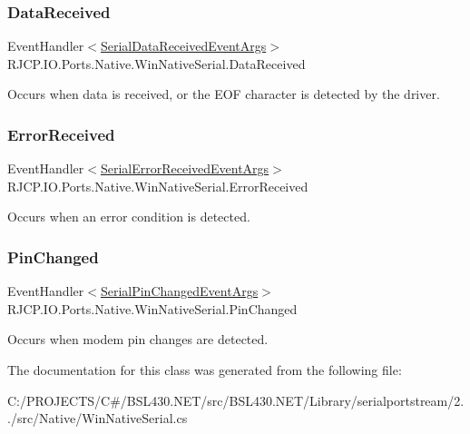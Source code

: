 \subsubsection{\texorpdfstring{DataReceived}{DataReceived}}
{\footnotesize\ttfamily Event\+Handler$<$\mbox{\hyperlink{class_r_j_c_p_1_1_i_o_1_1_ports_1_1_serial_data_received_event_args}{Serial\+Data\+Received\+Event\+Args}}$>$ R\+J\+C\+P.\+I\+O.\+Ports.\+Native.\+Win\+Native\+Serial.\+Data\+Received}



Occurs when data is received, or the E\+OF character is detected by the driver. 

\mbox{\label{class_r_j_c_p_1_1_i_o_1_1_ports_1_1_native_1_1_win_native_serial_a38516663cb2df0644f512fae0d4bd65d}} 
\subsubsection{\texorpdfstring{ErrorReceived}{ErrorReceived}}
{\footnotesize\ttfamily Event\+Handler$<$\mbox{\hyperlink{class_r_j_c_p_1_1_i_o_1_1_ports_1_1_serial_error_received_event_args}{Serial\+Error\+Received\+Event\+Args}}$>$ R\+J\+C\+P.\+I\+O.\+Ports.\+Native.\+Win\+Native\+Serial.\+Error\+Received}



Occurs when an error condition is detected. 

\mbox{\label{class_r_j_c_p_1_1_i_o_1_1_ports_1_1_native_1_1_win_native_serial_a792fefde319c63e680f024a48023617a}} 
\subsubsection{\texorpdfstring{PinChanged}{PinChanged}}
{\footnotesize\ttfamily Event\+Handler$<$\mbox{\hyperlink{class_r_j_c_p_1_1_i_o_1_1_ports_1_1_serial_pin_changed_event_args}{Serial\+Pin\+Changed\+Event\+Args}}$>$ R\+J\+C\+P.\+I\+O.\+Ports.\+Native.\+Win\+Native\+Serial.\+Pin\+Changed}



Occurs when modem pin changes are detected. 



The documentation for this class was generated from the following file\+:\begin{DoxyCompactItemize}
\item 
C\+:/\+P\+R\+O\+J\+E\+C\+T\+S/\+C\#/\+B\+S\+L430.\+N\+E\+T/src/\+B\+S\+L430.\+N\+E\+T/\+Library/serialportstream/2../src/\+Native/Win\+Native\+Serial.\+cs\end{DoxyCompactItemize}
